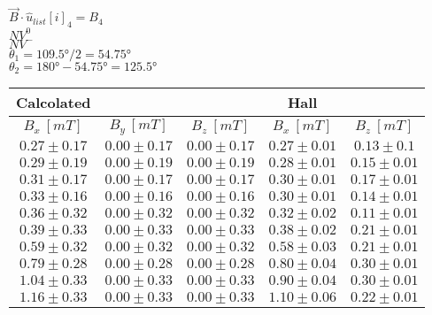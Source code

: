 \documentclass{report}
\begin{document}
    $\vec{B} \cdot \hat{u}_{list}[i]_4 = B_4$ \\
    $NV^0$\\
    $NV^-$\\
    $\theta_1 = \ang{109.5} / 2 = \ang{54.75}$\\
    $\theta_2 = \ang{180} - \ang{54.75} = \ang{125.5}$\\
    \begin{center}
    \begin{tabular}{|c|c|c||c|c|} \hline
    Calcolated & & & Hall &\\ \hline
    $B_x \ [mT]$ & $B_y \ [mT]$ & $B_z \ [mT]$ & $B_x \ [mT]$ & $B_z \ [mT]$ \\ \hline
    $ 0.27 \pm 0.17 $ & $ 0.00 \pm 0.17 $ & $ 0.00 \pm 0.17 $ & $ 0.27 \pm 0.01 $ & \cellcolor{red!25} $ 0.13 \pm 0.1 $ \\ \hline
    $ 0.29 \pm 0.19 $ & $ 0.00 \pm 0.19 $ & $ 0.00 \pm 0.19 $ & $ 0.28 \pm 0.01 $ & \cellcolor{red!25} $ 0.15 \pm 0.01 $ \\ \hline
    $ 0.31 \pm 0.17 $ & $ 0.00 \pm 0.17 $ & $ 0.00 \pm 0.17 $ & $ 0.30 \pm 0.01 $ & \cellcolor{red!25} $ 0.17 \pm 0.01 $ \\ \hline
    $ 0.33 \pm 0.16 $ & $ 0.00 \pm 0.16 $ & $ 0.00 \pm 0.16 $ & $ 0.30 \pm 0.01 $ & \cellcolor{red!25} $ 0.14 \pm 0.01 $ \\ \hline
    $ 0.36 \pm 0.32 $ & $ 0.00 \pm 0.32 $ & $ 0.00 \pm 0.32 $ & $ 0.32 \pm 0.02 $ & $ 0.11 \pm 0.01 $ \\ \hline
    $ 0.39 \pm 0.33 $ & $ 0.00 \pm 0.33 $ & $ 0.00 \pm 0.33 $ & $ 0.38 \pm 0.02 $ & $ 0.21 \pm 0.01 $ \\ \hline
    $ 0.59 \pm 0.32 $ & $ 0.00 \pm 0.32 $ & $ 0.00 \pm 0.32 $ & $ 0.58 \pm 0.03 $ & \cellcolor{red!25} $ 0.21 \pm 0.01 $ \\ \hline
    $ 0.79 \pm 0.28 $ & $ 0.00 \pm 0.28 $ & $ 0.00 \pm 0.28 $ & $ 0.80 \pm 0.04 $ & \cellcolor{red!25} $ 0.30 \pm 0.01 $ \\ \hline
    $ 1.04 \pm 0.33 $ & $ 0.00 \pm 0.33 $ & $ 0.00 \pm 0.33 $ & $ 0.90 \pm 0.04 $ & \cellcolor{red!25} $ 0.30 \pm 0.01 $ \\ \hline
    $ 1.16 \pm 0.33 $ & $ 0.00 \pm 0.33 $ & $ 0.00 \pm 0.33 $ & $ 1.10 \pm 0.06 $ & \cellcolor{red!25} $ 0.22 \pm 0.01 $ \\ \hline
    \end{tabular}
    \end{center}
\end{document}
